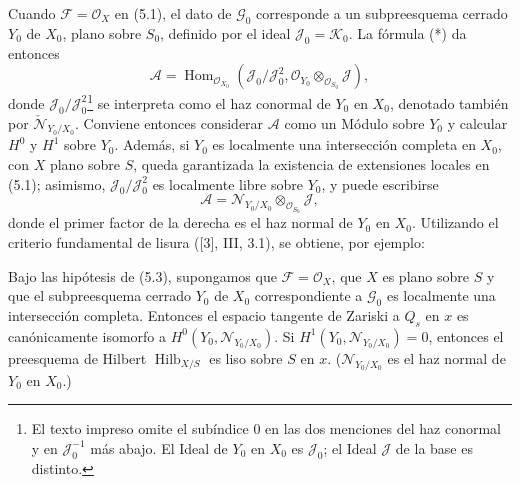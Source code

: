 Cuando $\mathcal F=\mathcal O_X$ en (5.1), el dato de $\mathcal G_0$
corresponde a un subpreesquema cerrado $Y_0$ de $X_0$, plano sobre $S_0$,
definido por el ideal $\mathcal J_0=\mathcal K_0$. La fórmula (*) da entonces
\[
\mathcal A=\operatorname{Hom}_{\mathcal O_{X_0}}
(\mathcal J_0/\mathcal J_0^2,
\mathcal O_{Y_0}\otimes_{\mathcal O_{S_0}}\mathcal J),
\]
donde $\mathcal J_0/\mathcal J_0^2$\footnote{El texto impreso omite el subíndice $0$ en las dos menciones del haz conormal y en $\mathcal J_0^{-1}$ más abajo. El Ideal de $Y_0$ en $X_0$ es $\mathcal J_0$; el Ideal $\mathcal J$ de la base es distinto.} se interpreta como el haz conormal de $Y_0$
en $X_0$, denotado también por
$\check{\mathcal N}_{Y_0/X_0}$. Conviene entonces considerar $\mathcal A$
como un Módulo sobre $Y_0$ y calcular $H^0$ y $H^1$ sobre $Y_0$. Además, si
$Y_0$ es localmente una intersección completa en $X_0$, con $X$ plano sobre
$S$, queda garantizada la existencia de extensiones locales en (5.1); asimismo,
$\mathcal J_0/\mathcal J_0^2$ es localmente libre sobre $Y_0$, y puede escribirse
\[
\mathcal A=\mathcal N_{Y_0/X_0}\otimes_{\mathcal O_{S_0}}\mathcal J,
\]
donde el primer factor de la derecha es el haz normal de $Y_0$ en $X_0$.
Utilizando el criterio fundamental de lisura ([3], III, 3.1), se obtiene, por
ejemplo:

 Bajo las hipótesis de (5.3), supongamos que
$\mathcal F=\mathcal O_X$, que $X$ es plano sobre $S$ y que el subpreesquema
cerrado $Y_0$ de $X_0$ correspondiente a $\mathcal G_0$ es localmente una
intersección completa. Entonces el espacio tangente de Zariski a $Q_s$ en $x$
es canónicamente isomorfo a $H^0(Y_0,\mathcal N_{Y_0/X_0})$. Si
$H^1(Y_0,\mathcal N_{Y_0/X_0})=0$, entonces el preesquema de Hilbert
$\operatorname{Hilb}_{X/S}$ es liso sobre $S$ en $x$.
($\mathcal N_{Y_0/X_0}$ es el haz normal de $Y_0$ en $X_0$.)

